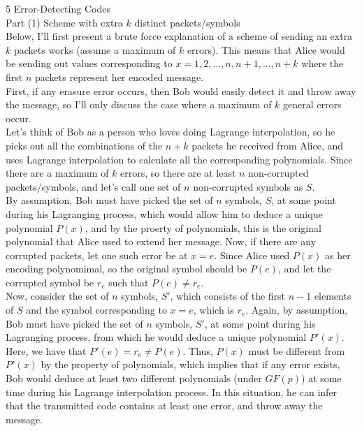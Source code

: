 \documentclass{article}
\begin{document}
{\Large 5 Error-Detecting Codes} \\[.5cm]
Part (1) Scheme with extra $k$ distinct packets/symbols \\[.1cm]

Below, I'll first present a brute force explanation of a scheme of sending an extra $k$ packets works (assume a maximum of $k$ errors). This means that Alice would be sending out values corresponding to $x = 1, 2, ..., n, n+1, ..., n+k$ where the first $n$ packets represent her encoded message. \\

First, if any erasure error occurs, then Bob would easily detect it and throw away the message, so I'll only discuss the case where a maximum of $k$ general errors occur. \\

Let's think of Bob as a person who loves doing Lagrange interpolation, so he picks out all the combinations of the $n+k$ packets he received from Alice, and uses Lagrange interpolation to calculate all the corresponding polynomials. Since there are a maximum of $k$ errors, so there are at least $n$ non-corrupted packets/symbols, and let's call one set of $n$ non-corrupted symbols as $S$. \\

By assumption, Bob must have picked the set of $n$ symbols, $S$, at some point during his Lagranging process, which would allow him to deduce a unique polynomial $P(x)$, and by the proerty of polynomials, this is the original polynomial that Alice used to extend her message. Now, if there are any corrupted packets, let one such error be at $x = e$. Since Alice used $P(x)$ as her encoding polynomimal, so the original symbol should be $P(e)$, and let the corrupted symbol be $r_e$ such that $P(e)\neq r_e$. \\

Now, consider the set of $n$ symbols, $S'$, which consists of the first $n-1$ elements of $S$ and the symbol corresponding to $x = e$, which is $r_e$. Again, by assumption, Bob must have picked the set of $n$ symbols, $S'$, at some point during his Lagranging process, from which he would deduce a unique polynomial $P'(x)$. Here, we have that $P'(e) = r_e\neq P(e)$. Thus, $P(x)$ must be different from $P'(x)$ by the property of polynomials, which implies that if any error exists, Bob would deduce at least two different polynomials (under $GF(p)$) at some time during his Lagrange interpolation process. In this situation, he can infer that the transmitted code contains at least one error, and throw away the message. \\
\end{document}
